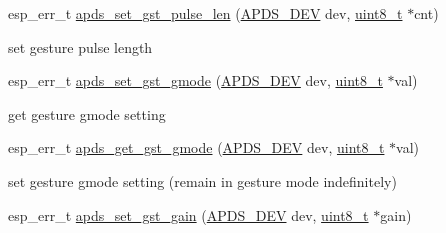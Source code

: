 \begin{DoxyCompactItemize}
esp\+\_\+err\+\_\+t \hyperlink{group__APDS9960__GestureFunctions_ga4f67cf1ce89086c43c6f40cb2509fc65}{apds\+\_\+set\+\_\+gst\+\_\+pulse\+\_\+len} (\hyperlink{structAPDS9960__Driver}{A\+P\+D\+S\+\_\+\+D\+EV} dev, \hyperlink{vl53l0x__types_8h_aba7bc1797add20fe3efdf37ced1182c5}{uint8\+\_\+t} $\ast$cnt)
\begin{DoxyCompactList}\small\item\em 
\begin{DoxyItemize}
\item set gesture pulse length 
\end{DoxyItemize}\end{DoxyCompactList}\item 
esp\+\_\+err\+\_\+t \hyperlink{group__APDS9960__GestureFunctions_gab60c4efecc5980d5aee3671407e79f98}{apds\+\_\+set\+\_\+gst\+\_\+gmode} (\hyperlink{structAPDS9960__Driver}{A\+P\+D\+S\+\_\+\+D\+EV} dev, \hyperlink{vl53l0x__types_8h_aba7bc1797add20fe3efdf37ced1182c5}{uint8\+\_\+t} $\ast$val)
\begin{DoxyCompactList}\small\item\em 
\begin{DoxyItemize}
\item get gesture gmode setting 
\end{DoxyItemize}\end{DoxyCompactList}\item 
esp\+\_\+err\+\_\+t \hyperlink{group__APDS9960__GestureFunctions_ga63ac7b590416a14f49b7bcfd463b8017}{apds\+\_\+get\+\_\+gst\+\_\+gmode} (\hyperlink{structAPDS9960__Driver}{A\+P\+D\+S\+\_\+\+D\+EV} dev, \hyperlink{vl53l0x__types_8h_aba7bc1797add20fe3efdf37ced1182c5}{uint8\+\_\+t} $\ast$val)
\begin{DoxyCompactList}\small\item\em 
\begin{DoxyItemize}
\item set gesture gmode setting (remain in gesture mode indefinitely) 
\end{DoxyItemize}\end{DoxyCompactList}\item 
esp\+\_\+err\+\_\+t \hyperlink{group__APDS9960__GestureFunctions_gac1a57bc5aafbf162eecc2cd0939407a5}{apds\+\_\+set\+\_\+gst\+\_\+gain} (\hyperlink{structAPDS9960__Driver}{A\+P\+D\+S\+\_\+\+D\+EV} dev, \hyperlink{vl53l0x__types_8h_aba7bc1797add20fe3efdf37ced1182c5}{uint8\+\_\+t} $\ast$gain)
\begin{DoxyCompactList}\small\item\em 
\begin{DoxyItemize}

\end{DoxyItemize}
\end{DoxyCompactList}
\end{DoxyCompactItemize}
